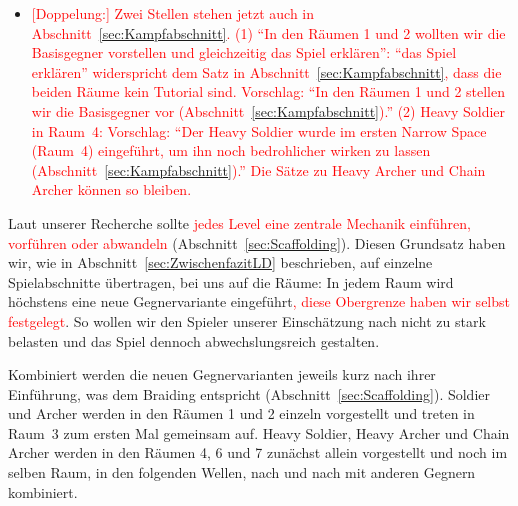 \documentclass[../Main.tex]{subfiles}
\begin{document}
\begin{itemize}[leftmargin=1.5cm]
    \item \textcolor{red}{[Doppelung:] Zwei Stellen stehen jetzt auch in Abschnitt~\ref{sec:Kampfabschnitt}. (1) \enquote{In den Räumen 1 und 2 wollten wir die Basisgegner vorstellen und gleichzeitig das Spiel erklären}: \enquote{das Spiel erklären} widerspricht dem Satz in Abschnitt~\ref{sec:Kampfabschnitt}, dass die beiden Räume kein Tutorial sind. Vorschlag: \enquote{In den Räumen 1 und 2 stellen wir die Basisgegner vor (Abschnitt~\ref{sec:Kampfabschnitt}).} (2) Heavy Soldier in Raum~4: Vorschlag: \enquote{Der Heavy Soldier wurde im ersten Narrow Space (Raum~4) eingeführt, um ihn noch bedrohlicher wirken zu lassen (Abschnitt~\ref{sec:Kampfabschnitt}).} Die Sätze zu Heavy Archer und Chain Archer können so bleiben.}
\end{itemize}

Laut unserer Recherche sollte \textcolor{red}{jedes Level eine zentrale Mechanik einführen, vorführen oder abwandeln} (Abschnitt~\ref{sec:Scaffolding}). Diesen Grundsatz haben wir, wie in Abschnitt~\ref{sec:ZwischenfazitLD} beschrieben, auf einzelne Spielabschnitte übertragen, bei uns auf die Räume: In jedem Raum wird höchstens eine neue Gegnervariante eingeführt\textcolor{red}{, diese Obergrenze haben wir selbst festgelegt}. So wollen wir den Spieler unserer Einschätzung nach nicht zu stark belasten und das Spiel dennoch abwechslungsreich gestalten.

Kombiniert werden die neuen Gegnervarianten jeweils kurz nach ihrer Einführung, was dem Braiding entspricht (Abschnitt~\ref{sec:Scaffolding}). Soldier und Archer werden in den Räumen 1 und 2 einzeln vorgestellt und treten in Raum~3 zum ersten Mal gemeinsam auf. Heavy Soldier, Heavy Archer und Chain Archer werden in den Räumen 4, 6 und 7 zunächst allein vorgestellt und noch im selben Raum, in den folgenden Wellen, nach und nach mit anderen Gegnern kombiniert.
\end{document}
